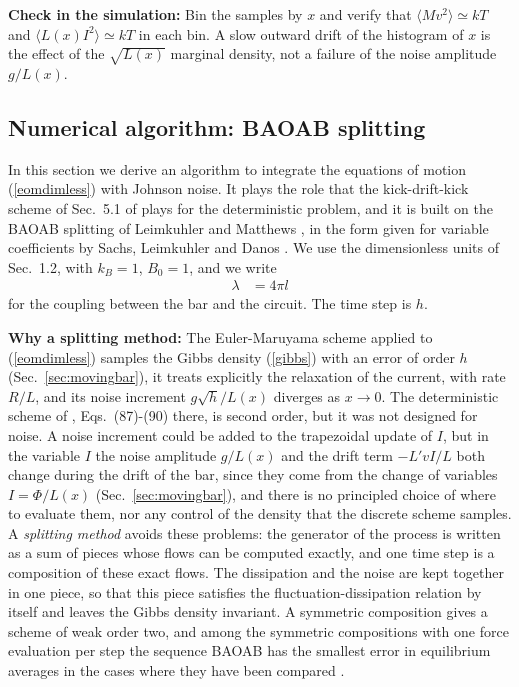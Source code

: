 \documentclass[11pt]{article}
\begin{document}
{\bf Check in the simulation:} Bin the samples by $x$ and verify that $\langle Mv^2\rangle\simeq kT$ and $\langle L(x)I^2\rangle\simeq kT$ in each bin. A slow outward drift of the histogram of $x$ is the effect of the $\sqrt{L(x)}$ marginal density, not a failure of the noise amplitude $g/L(x)$.


\subsection{Numerical algorithm: BAOAB splitting}\label{sec:baoab}
In this section we derive an algorithm to integrate the equations of motion (\ref{eomdimless}) with Johnson noise. It plays the role that the kick-drift-kick scheme of Sec.~5.1 of \cite{alvarez} plays for the deterministic problem, and it is built on the BAOAB splitting of Leimkuhler and Matthews \cite{leimkuhler}, in the form given for variable coefficients by Sachs, Leimkuhler and Danos \cite{sachs}. We use the dimensionless units of Sec.~1.2, with $k_B=1$, $B_0=1$, and we write
\begin{align}
  \lambda&=4\pi l
\end{align}
for the coupling between the bar and the circuit. The time step is $h$.

{\bf Why a splitting method:} The Euler-Maruyama scheme applied to (\ref{eomdimless}) samples the Gibbs density (\ref{gibbs}) with an error of order $h$ (Sec.~\ref{sec:movingbar}), it treats explicitly the relaxation of the current, with rate $R/L$, and its noise increment $g\sqrt{h}/L(x)$ diverges as $x\to0$. The deterministic scheme of \cite{alvarez}, Eqs.~(87)-(90) there, is second order, but it was not designed for noise. A noise increment could be added to the trapezoidal update of $I$, but in the variable $I$ the noise amplitude $g/L(x)$ and the drift term $-L'vI/L$ both change during the drift of the bar, since they come from the change of variables $I=\Phi/L(x)$ (Sec.~\ref{sec:movingbar}), and there is no principled choice of where to evaluate them, nor any control of the density that the discrete scheme samples. A {\it splitting method} \cite{leimkuhler} avoids these problems: the generator of the process is written as a sum of pieces whose flows can be computed exactly, and one time step is a composition of these exact flows. The dissipation and the noise are kept together in one piece, so that this piece satisfies the fluctuation-dissipation relation by itself and leaves the Gibbs density invariant. A symmetric composition gives a scheme of weak order two, and among the symmetric compositions with one force evaluation per step the sequence BAOAB has the smallest error in equilibrium averages in the cases where they have been compared \cite{leimkuhler,sachs}.
\end{document}
